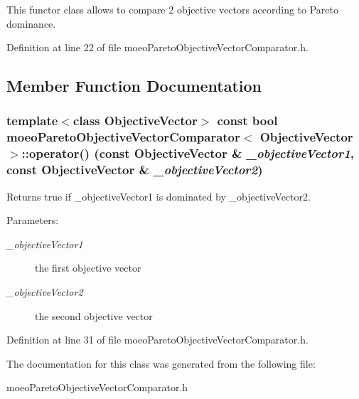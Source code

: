 This functor class allows to compare 2 objective vectors according to Pareto dominance. 



Definition at line 22 of file moeo\-Pareto\-Objective\-Vector\-Comparator.h.

\subsection{Member Function Documentation}
\subsubsection{\setlength{\rightskip}{0pt plus 5cm}template$<$class Objective\-Vector$>$ const bool \bf{moeo\-Pareto\-Objective\-Vector\-Comparator}$<$ Objective\-Vector $>$::operator() (const Objective\-Vector \& {\em \_\-objective\-Vector1}, const Objective\-Vector \& {\em \_\-objective\-Vector2})\hspace{0.3cm}{\tt  [inline]}}\label{classmoeoParetoObjectiveVectorComparator_9bd4302396fb179efe14035dc097726c}


Returns true if \_\-objective\-Vector1 is dominated by \_\-objective\-Vector2. 

\begin{Desc}
\item[Parameters:]
\begin{description}
\item[{\em \_\-objective\-Vector1}]the first objective vector \item[{\em \_\-objective\-Vector2}]the second objective vector \end{description}
\end{Desc}


Definition at line 31 of file moeo\-Pareto\-Objective\-Vector\-Comparator.h.

The documentation for this class was generated from the following file:\begin{CompactItemize}
\item 
moeo\-Pareto\-Objective\-Vector\-Comparator.h\end{CompactItemize}
